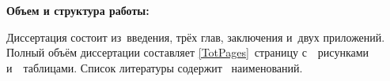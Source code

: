 \chapter*{}                         %

\newcommand{\actuality}{}
\newcommand{\progress}{}
\newcommand{\aim}{{\textbf\aimTXT}}
\newcommand{\tasks}{\textbf{\tasksTXT}}
\newcommand{\novelty}{\textbf{\noveltyTXT}}
\newcommand{\influence}{\textbf{\influenceTXT}}
\newcommand{\methods}{\textbf{\methodsTXT}}
\newcommand{\defpositions}{\textbf{\defpositionsTXT}}
\newcommand{\reliability}{\textbf{\reliabilityTXT}}
\newcommand{\probation}{\textbf{\probationTXT}}
\newcommand{\contribution}{\textbf{\contributionTXT}}
\newcommand{\publications}{\textbf{\publicationsTXT}}

{\fontsize{14pt}{14.9pt}\selectfont

\textbf{Объем и структура работы:}

Диссертация состоит из~введения, трёх глав,
заключения и~двух приложений.
Полный объём диссертации составляет  \ref*{TotPages}~страницу
с~\totalfigures{}~рисунками и~\totaltables{}~таблицами. Список литературы
содержит ~наименований.

}
